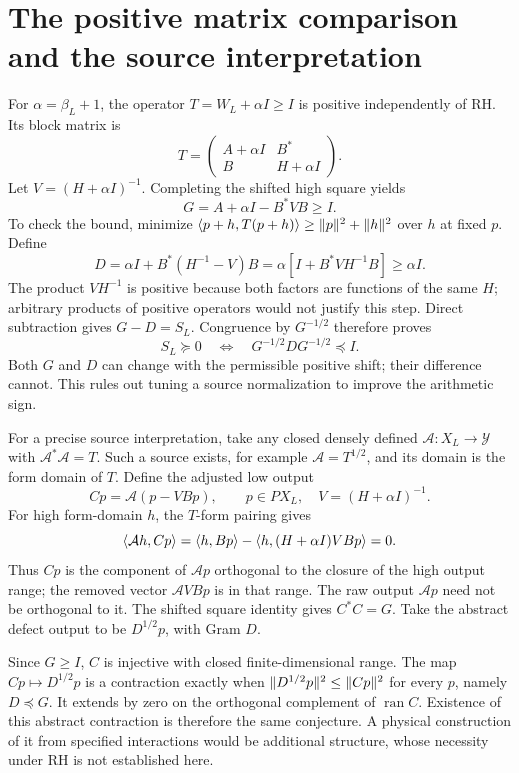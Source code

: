 \section{The positive matrix comparison and the source interpretation}
For $\alpha=\beta_L+1$, the operator $T=W_L+\alpha I\ge I$ is positive
independently of RH. Its block matrix is
\[
T=\begin{pmatrix}A+\alpha I&B^*\\B&H+\alpha I\end{pmatrix}.
\]
Let $V=(H+\alpha I)^{-1}$. Completing the shifted high square yields
\[
G=A+\alpha I-B^*VB\ge I.
\]
To check the bound, minimize $\langle p+h,T(p+h)\rangle\ge\lVert p\rVert^2+\lVert h\rVert^2$
over $h$ at fixed $p$. Define
\[
D=\alpha I+B^*(H^{-1}-V)B
=\alpha[I+B^*VH^{-1}B]\ge\alpha I.
\]
The product $VH^{-1}$ is positive because both factors are functions of
the same $H$; arbitrary products of positive operators would not justify
this step. Direct subtraction gives $G-D=S_L$. Congruence by $G^{-1/2}$
therefore proves
\begin{equation}\label{d:contraction}
S_L\succeq0\quad\Longleftrightarrow\quad
G^{-1/2}DG^{-1/2}\preceq I.
\end{equation}
Both $G$ and $D$ can change with the permissible positive shift; their
difference cannot. This rules out tuning a source normalization to improve
the arithmetic sign.

For a precise source interpretation, take any closed densely defined
$\mathcal A:X_L\to\mathcal Y$ with $\mathcal A^*\mathcal A=T$.
Such a source exists, for example $\mathcal A=T^{1/2}$, and its domain
is the form domain of $T$. Define the adjusted low output
\begin{equation}\label{d:projected-source}
Cp=\mathcal A(p-VBp),\qquad p\in PX_L,\quad V=(H+\alpha I)^{-1}.
\end{equation}
For high form-domain $h$, the $T$-form pairing gives
\[
\langle \mathcal A h,Cp\rangle
=\langle h,Bp\rangle-\langle h,(H+\alpha I)VBp\rangle=0.
\]
Thus $Cp$ is the component of $\mathcal Ap$ orthogonal to the closure
of the high output range; the removed vector $\mathcal AVBp$ is in that
range. The raw output $\mathcal Ap$ need not be orthogonal to it.
The shifted square identity gives $C^*C=G$. Take the abstract defect
output to be $D^{1/2}p$, with Gram $D$.

Since $G\ge I$, $C$ is injective with closed finite-dimensional range.
The map $Cp\mapsto D^{1/2}p$ is a contraction exactly when
$\lVert D^{1/2}p\rVert^2\le\lVert Cp\rVert^2$ for every $p$, namely $D\preceq G$.
It extends by zero on the orthogonal complement of $\operatorname{ran}C$.
Existence of this abstract contraction is therefore the same conjecture.
A physical construction of it from specified interactions would be
additional structure, whose necessity under RH is not established here.

